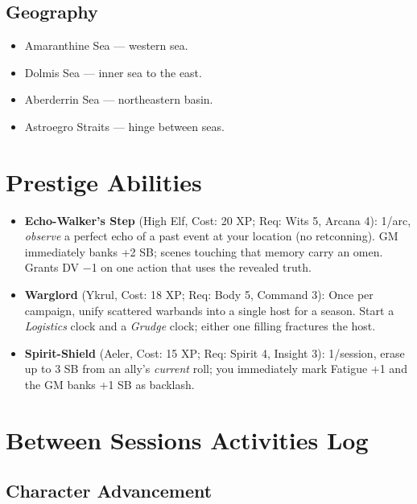 \subsection{Geography}
\begin{itemize}
\item Amaranthine Sea --- western sea.
\item Dolmis Sea --- inner sea to the east.
\item Aberderrin Sea --- northeastern basin.
\item Astroegro Straits --- hinge between seas.
\end{itemize}

\section{Prestige Abilities}
\begin{itemize}
    \item \textbf{Echo-Walker's Step} (High Elf, Cost: 20 XP; Req: Wits 5, Arcana 4): 
1/arc, \emph{observe} a perfect echo of a past event at your location (no retconning). 
GM immediately banks +2 SB; scenes touching that memory carry an omen. Grants DV −1 on one action that uses the revealed truth.
    \item \textbf{Warglord} (Ykrul, Cost: 18 XP; Req: Body 5, Command 3): 
Once per campaign, unify scattered warbands into a single host for a season. Start a \emph{Logistics} clock and a \emph{Grudge} clock; either one filling fractures the host.
    \item \textbf{Spirit-Shield} (Aeler, Cost: 15 XP; Req: Spirit 4, Insight 3): 
1/session, erase up to 3 SB from an ally's \emph{current} roll; you immediately mark Fatigue +1 and the GM banks +1 SB as backlash.
\end{itemize}

\section{Between Sessions Activities Log}

\subsection{Character Advancement}

